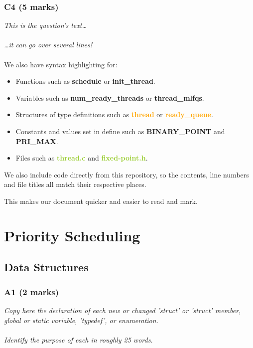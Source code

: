 \documentclass{report}
\newcommand{\question}[1]{\textit{#1} \\ }
\newcommand{\fun}[1]{\textcolor{Emerald}{\textbf{#1}}}
\newcommand{\file}[1]{\textcolor{YellowGreen}{\textbf{#1}}}
\newcommand{\struct}[1]{\textcolor{orange}{\textbf{#1}}}
\newcommand{\var}[1]{\textcolor{RoyalPurple}{\textbf{#1}}}
\newcommand{\const}[1]{\textcolor{BrickRed}{\textbf{#1}}}
\newcommand{\pintoscode}[4]{}
\begin{document}
            \subsubsection*{C4 (5 marks)}
            \question{This is the question's text\dots
            \\
            \\ \dots it can go over several lines!}
            \\ We also have syntax highlighting for:
            \begin{itemize}
                \item Functions such as \fun{schedule} or \fun{init\_thread}.
                \item Variables such as \var{num\_ready\_threads} or \var{thread\_mlfqs}.
                \item Structures of type definitions such as \struct{thread} or \struct{ready\_queue}.
                \item Constants and values set in define such as \const{BINARY\_POINT} and \const{PRI\_MAX}.
                \item Files such as \file{thread.c} and \file{fixed-point.h}.
            \end{itemize}
            We also include code directly from this repository, so the contents, line numbers and file titles all match their respective places.
            \pintoscode{163}{167}{thread.c}{thread.c}
            This makes our document quicker and easier to read and mark.
    \section*{Priority Scheduling}
        \subsection*{Data Structures}
            \subsubsection*{A1  (2 marks) }
                \question{Copy here the declaration of each new or changed 'struct' or 'struct' member, global or static variable, 'typedef', or enumeration.  
                \\
                \\ Identify the purpose of each in roughly 25 words.}
                
\end{document}
